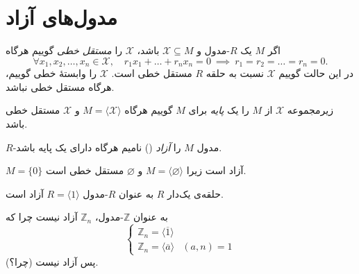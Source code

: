 \section{}
\section{مدول‌های آزاد}

\begin{frame}
    \begin{definition}
        اگر $M$ یک $R$-مدول و $\mathcal{X} \subseteq M$ باشد،
        $\mathcal{X}$ را \textit{مستقل خطی} گوییم هرگاه
        \[
            \forall x_1, x_2, \dots, x_n \in \mathcal{X}, \quad r_1 x_1 + \dots + r_n x_n = 0 \ \implies\ r_1 = r_2 = \dots = r_n = 0.
        \]
        در این حالت گوییم $\mathcal{X}$ نسبت به حلقه $R$ مستقل خطی است.
        $\mathcal{X}$ را وابستهٔ خطی گوییم، هرگاه مستقل خطی نباشد.
    \end{definition}

    \begin{definition}
        زیرمجموعه $\mathcal{X}$ از $M$ را یک \textit{پایه} برای $M$ گوییم هرگاه $M = \langle \mathcal{X} \rangle$ و $\mathcal{X}$ مستقل خطی باشد.
    \end{definition}

    \begin{definition}
        $R$-مدول $M$ را \textit{آزاد} () نامیم هرگاه دارای یک پایه باشد.
    \end{definition}
\end{frame}




\begin{frame}

    \begin{example}
        $M = \{0\}$ آزاد است زیرا $M = \langle \varnothing \rangle$ و $\varnothing$ مستقل خطی است.
    \end{example}

    \begin{example}
        حلقه‌ی یک‌دار $R$ به عنوان $R$-مدول $R = \langle 1 \rangle$ آزاد است.
    \end{example}

    \begin{example}
        به عنوان $\mathbb{Z}$-مدول، $\mathbb{Z}_n$ آزاد نیست
        چرا که
        \[
            \begin{cases}
                \mathbb{Z}_n = \langle \overline{1} \rangle              \\
                \mathbb{Z}_n = \langle \overline{a} \rangle & (a, n) = 1
            \end{cases}
        \]
        پس آزاد نیست (چرا؟).
    \end{example}
\end{frame}


